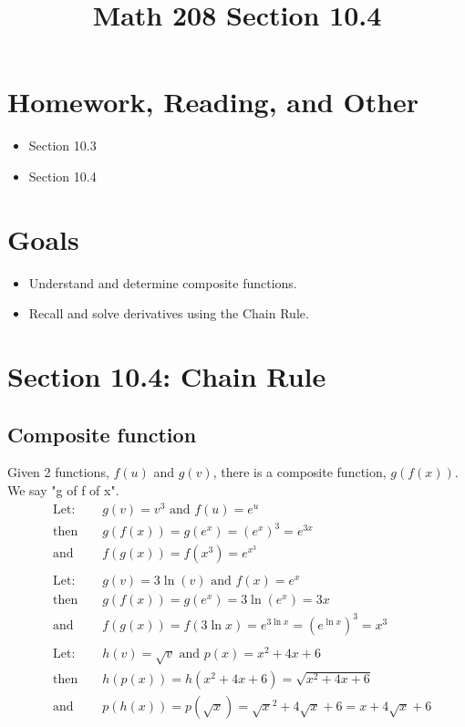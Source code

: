 \documentclass[14pt]{extarticle}
\title{\vspace{-5ex}Math 208 Section 10.4}
\date{\vspace{-10ex}}
\begin{document}
	\maketitle
		
\section{Homework, Reading, and Other}
\begin{itemize}
	\item Section 10.3
	\item Section 10.4
\end{itemize}

\section{Goals}
\begin{itemize}
	\item Understand and determine composite functions.
	\item Recall and solve derivatives using the Chain Rule.
\end{itemize}

\section{Section 10.4: Chain Rule}
\subsection{Composite function}
Given 2 functions, $f(u)$ and $g(v)$, there is a composite function, $g(f(x))$. We say "g of f of x".
\begin{align*}
	&\text{Let:} & &g(v) = v^3 \text{ and } f(u) = e^u \\
	&\text{then } & &g(f(x)) = g(e^x) = (e^x)^3 = e^{3x} \tag{1}\\
	&\text{and } & &f(g(x)) = f(x^3) = e^{x^3}	\tag{2}
	\\\\
	&\text{Let:} & &g(v) = 3\ln(v) \text{ and } f(x) = e^x \\
	&\text{then } & &g(f(x)) = g(e^x) = 3\ln(e^x) = 3x \\
	&\text{and } & &f(g(x)) = f(3\ln x) = e^{3\ln x} = (e^{\ln x})^3 = x^3
	\\\\
	&\text{Let:} & &h(v) = \sqrt{v} \text{ and } p(x) = x^2 + 4x + 6 \\
	&\text{then } & &h(p(x)) = h(x^2 + 4x + 6) = \sqrt{x^2 + 4x + 6} \tag{3}\\
	&\text{and } & &p(h(x)) = p(\sqrt{x}) = \sqrt{x}^2 +4\sqrt{x}+6 = x+4\sqrt{x}+6
\end{align*}
\end{document}
